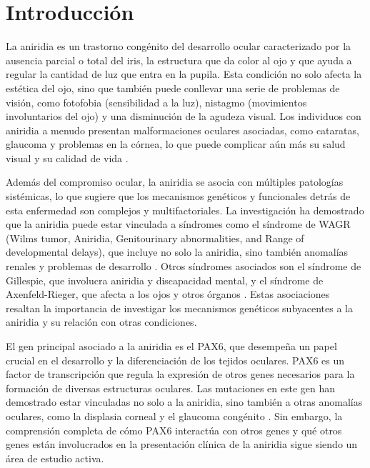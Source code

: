 \section{Introducción}

La aniridia es un trastorno congénito del desarrollo ocular caracterizado por la ausencia parcial o total del iris, la estructura que da color al ojo y que ayuda a regular la cantidad de luz que entra en la pupila. Esta condición no solo afecta la estética del ojo, sino que también puede conllevar una serie de problemas de visión, como fotofobia (sensibilidad a la luz), nistagmo (movimientos involuntarios del ojo) y una disminución de la agudeza visual. Los individuos con aniridia a menudo presentan malformaciones oculares asociadas, como cataratas, glaucoma y problemas en la córnea, lo que puede complicar aún más su salud visual y su calidad de vida \cite{Landsend2021}.

Además del compromiso ocular, la aniridia se asocia con múltiples patologías sistémicas, lo que sugiere que los mecanismos genéticos y funcionales detrás de esta enfermedad son complejos y multifactoriales. \cite{BLACK2022389} La investigación ha demostrado que la aniridia puede estar vinculada a síndromes como el síndrome de WAGR (Wilms tumor, Aniridia, Genitourinary abnormalities, and Range of developmental delays), que incluye no solo la aniridia, sino también anomalías renales y problemas de desarrollo \cite{lopezrelacion}. Otros síndromes asociados son el síndrome de Gillespie, que involucra aniridia y discapacidad mental, y el síndrome de Axenfeld-Rieger, que afecta a los ojos y otros órganos \cite{Law2011}. Estas asociaciones resaltan la importancia de investigar los mecanismos genéticos subyacentes a la aniridia y su relación con otras condiciones.

El gen principal asociado a la aniridia es el PAX6, que desempeña un papel crucial en el desarrollo y la diferenciación de los tejidos oculares. \cite{robles_lopez_2012} PAX6 es un factor de transcripción que regula la expresión de otros genes necesarios para la formación de diversas estructuras oculares. Las mutaciones en este gen han demostrado estar vinculadas no solo a la aniridia, sino también a otras anomalías oculares, como la displasia corneal y el glaucoma congénito \cite{CalvaoPires2014}. Sin embargo, la comprensión completa de cómo PAX6 interactúa con otros genes y qué otros genes están involucrados en la presentación clínica de la aniridia sigue siendo un área de estudio activa.


